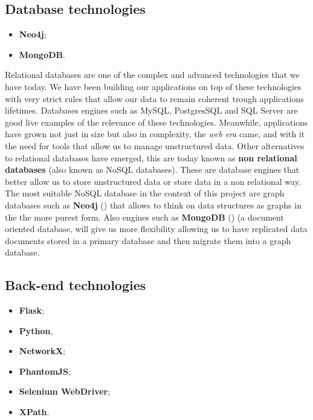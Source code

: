 \subsection{Database technologies}
\begin{itemize}
    \item \textbf{Neo4j};
    \item \textbf{MongoDB}.
\end{itemize}

Relational databases are one of the complex and advanced technologies that we have today. We have been building our applications on top of these technologies with very strict rules that allow our data to remain coherent trough applications lifetimes. Databases engines such as MySQL, PostgresSQL and SQL Server are good live examples of the relevance of these technologies. Meanwhile, applications have grown not just in size but also in complexity, the \textit{web era} came, and with it the need for tools that allow us to manage unstructured data. Other alternatives to relational databases have emerged, this are today known as \textbf{non relational databases} (also known as NoSQL databases). These are database engines that better allow us to store unstructured data or store data in a non relational way. The most suitable NoSQL database in the context of this project are graph databases such as \textbf{Neo4j} (\cite{developers2012neo4j}) that allows to think on data structures as graphs in the the more purest form. Also engines such as \textbf{MongoDB} (\cite{mongodb}) (a document oriented database, will give us more flexibility allowing us to have replicated data documents stored in a primary database and then migrate them into a graph database.

\subsection{Back-end technologies}
\begin{itemize}
    \item \textbf{Flask};
    \item \textbf{Python},
    \item \textbf{NetworkX};
    \item \textbf{PhantomJS};
    \item \textbf{Selenium WebDriver};
    \item \textbf{XPath}.
\end{itemize}

